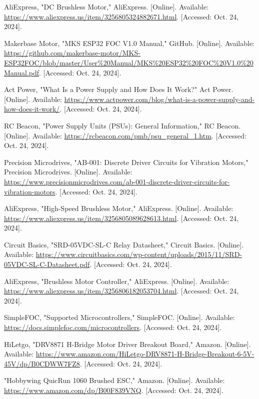 \begin{thebibliography}{45}
	AliExpress, "DC Brushless Motor," AliExpress. [Online]. Available: \url{https://www.aliexpress.us/item/3256805324882671.html}. [Accessed: Oct. 24, 2024]. 
	
	Makerbase Motor, "MKS ESP32 FOC V1.0 Manual," GitHub. [Online]. Available: \url{https://github.com/makerbase-motor/MKS-ESP32FOC/blob/master/User%20Manual/MKS%20ESP32%20FOC%20V1.0%20Manual.pdf}. [Accessed: Oct. 24, 2024]. 
	
	Act Power, "What Is a Power Supply and How Does It Work?" Act Power. [Online]. Available: \url{https://www.actpower.com/blog/what-is-a-power-supply-and-how-does-it-work/}. [Accessed: Oct. 24, 2024]. 
	
	RC Beacon, "Power Supply Units (PSUs): General Information," RC Beacon. [Online]. Available: \url{https://rcbeacon.com/pmb/psu_general_1.htm}. [Accessed: Oct. 24, 2024]. 
	
	Precision Microdrives, "AB-001: Discrete Driver Circuits for Vibration Motors," Precision Microdrives. [Online]. Available: \url{https://www.precisionmicrodrives.com/ab-001-discrete-driver-circuits-for-vibration-motors}. [Accessed: Oct. 24, 2024]. 
	
	AliExpress, "High-Speed Brushless Motor," AliExpress. [Online]. Available: \url{https://www.aliexpress.us/item/3256805089628613.html}. [Accessed: Oct. 24, 2024]. 
	
	Circuit Basics, "SRD-05VDC-SL-C Relay Datasheet," Circuit Basics. [Online]. Available: \url{https://www.circuitbasics.com/wp-content/uploads/2015/11/SRD-05VDC-SL-C-Datasheet.pdf}. [Accessed: Oct. 24, 2024]. 
	
	AliExpress, "Brushless Motor Controller," AliExpress. [Online]. Available: \url{https://www.aliexpress.us/item/3256806182053704.html}. [Accessed: Oct. 24, 2024]. 
	
	SimpleFOC, "Supported Microcontrollers," SimpleFOC. [Online]. Available: \url{https://docs.simplefoc.com/microcontrollers}. [Accessed: Oct. 24, 2024]. 
	
	HiLetgo, "DRV8871 H-Bridge Motor Driver Breakout Board," Amazon. [Online]. Available: \url{https://www.amazon.com/HiLetgo-DRV8871-H-Bridge-Breakout-6-5V-45V/dp/B0CDWW7FZ8}. [Accessed: Oct. 24, 2024]. 
	
	"Hobbywing QuicRun 1060 Brushed ESC," Amazon. [Online]. Available: \url{https://www.amazon.com/dp/B00F839VNQ}. [Accessed: Oct. 24, 2024]. 
	

\end{thebibliography}
